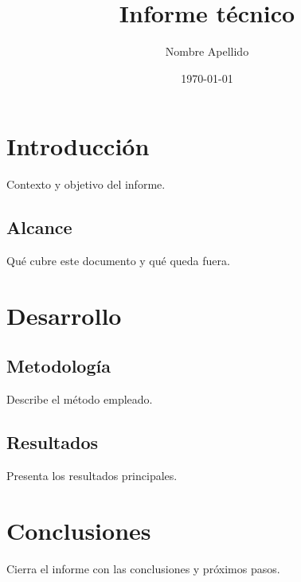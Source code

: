 \documentclass[11pt,a4paper]{report}
\title{Informe técnico}
\author{Nombre Apellido}
\date{\today}
\begin{document}
\maketitle

\tableofcontents

\chapter{Introducción}
Contexto y objetivo del informe.

\section{Alcance}
Qué cubre este documento y qué queda fuera.

\chapter{Desarrollo}
\section{Metodología}
Describe el método empleado.

\section{Resultados}
Presenta los resultados principales.

\chapter{Conclusiones}
Cierra el informe con las conclusiones y próximos pasos.
\end{document}

